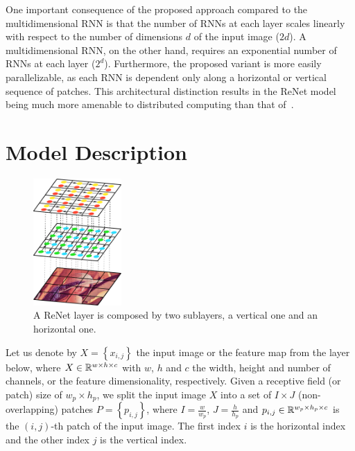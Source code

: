 One important consequence of the proposed approach compared to the
multidimensional RNN is that the number of RNNs at each layer scales linearly
with respect to the number of dimensions $d$ of the input image ($2d$). A
multidimensional RNN, on the other hand, requires an exponential number of RNNs
at each layer ($2^d$). Furthermore, the proposed variant is more easily
parallelizable, as each RNN is dependent only along a horizontal or vertical
sequence of patches. This architectural distinction results in the ReNet model
being much more amenable to distributed computing than that
of~\citet{Graves+Schmidhuber-2009}.


\section{Model Description}\label{sec:renet_model}

\begin{figure}[t]
    \centering
    \includegraphics[width=0.3\textwidth]{img/renet/renet_first_layer.pdf}
    \caption{A ReNet layer is composed by two sublayers, a vertical one and an
        horizontal one.}
    \label{fig:renet_layer}
    \vspace{-3mm}
\end{figure}

Let us denote by $X=\left\{x_{i,j}\right\}$ the input image or the feature map
from the layer below, where $X \in \mathbb{R}^{w \times h \times c}$ with $w$, $h$ and
$c$ the width, height and number of channels, or the feature dimensionality,
respectively. Given a receptive field (or patch) size of $w_p \times h_p$, we
split the input image $X$ into a set of $I \times J$ (non-overlapping) patches
$P = \left\{ p_{i,j} \right\}$, where $I = \frac{w}{w_p}$, $J = \frac{h}{h_p}$
and $p_{i,j} \in \mathbb{R}^{w_p \times h_p \times c}$ is the $(i,j)$-th patch of the
input image. The first index $i$ is the horizontal index and the other index
$j$ is the vertical index.

